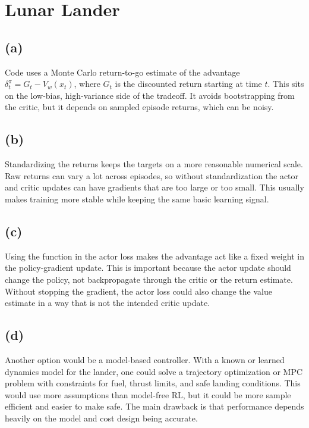 \section{Lunar Lander}

\subsection*{(a)}
Code uses a Monte Carlo return-to-go estimate of the advantage $\delta_t^\pi = G_t - V_w(x_t)$,
where \(G_t\) is the discounted return starting at time \(t\). This sits on the
low-bias, high-variance side of the tradeoff. It avoids bootstrapping from the
critic, but it depends on sampled episode returns, which can be noisy.

\subsection*{(b)}
Standardizing the returns keeps the targets on a more reasonable numerical
scale. Raw returns can vary a lot across episodes, so without standardization
the actor and critic updates can have gradients that are too large or too small.
This usually makes training more stable while keeping the same basic learning
signal.

\subsection*{(c)}
Using the function in the actor loss makes the advantage act
like a fixed weight in the policy-gradient update. This is important because the
actor update should change the policy, not backpropagate through the critic or
the return estimate. Without stopping the gradient, the actor loss could also
change the value estimate in a way that is not the intended critic update.

\subsection*{(d)}
Another option would be a model-based controller. With a known or learned
dynamics model for the lander, one could solve a trajectory optimization or MPC
problem with constraints for fuel, thrust limits, and safe landing conditions.
This would use more assumptions than model-free RL, but it could be more sample
efficient and easier to make safe. The main drawback is that performance depends
heavily on the model and cost design being accurate.
